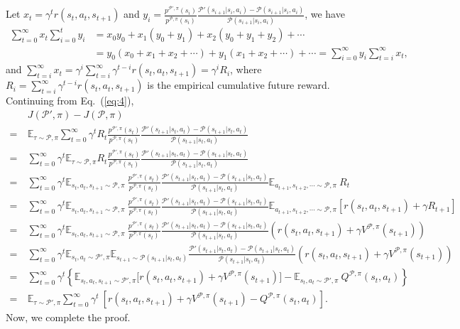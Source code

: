 \documentclass[letterpaper]{article} %
\def\E{{\mathbb{E}}}
\def\P{{\mathcal{P}}}
\begin{document}
Let $x_t=\gamma^t r(s_t,a_t,s_{t+1})$ and $y_i=\frac{p^{\P',\pi}(s_i)}{p^{\P,\pi}(s_i)}
\frac{\P'(s_{i+1}|s_i,a_i)-\P(s_{i+1}|s_i,a_i)}{\P(s_{i+1}|s_i,a_i)}$, we have
{\small
\begin{align*}
\sum_{t=0}^{\infty}x_t\sum_{i=0}^t y_i
&=x_0y_0+x_1(y_0+y_1)+x_2(y_0+y_1+y_2)+\cdots
\\
&=y_0(x_0+x_1+x_2+\cdots)+y_1(x_1+x_2+\cdots)+\cdots
=\sum_{i=0}^{\infty}y_i\sum_{t=i}^{\infty}x_t,
\end{align*}
}\noindent
and $\sum_{t=i}^\infty x_t=\gamma^{i}\sum_{t=i}^\infty\gamma^{t-i} r(s_t,a_t,s_{t+1})=\gamma^i R_i$, where $R_i=\sum_{t=i}^\infty\gamma^{t-i} r(s_t,a_t,s_{t+1})$ is the empirical cumulative future reward. Continuing from Eq.~(\ref{eq:4}),
{\small
\begin{align}
&J(\P',\pi)-J(\P,\pi)
\nonumber
\\
=\ &
\E_{\tau\sim\P,\pi}\sum_{t=0}^{\infty}\gamma^t R_t
\frac{p^{\P',\pi}(s_t)}{p^{\P,\pi}(s_t)}
\frac{\P'(s_{t+1}|s_t,a_t)-\P(s_{t+1}|s_t,a_t)}{\P(s_{t+1}|s_t,a_t)}
\nonumber
\\
=\ &
\sum_{t=0}^{\infty}\gamma^t
\E_{\tau\sim\P,\pi}
R_t\frac{p^{\P',\pi}(s_t)}{p^{\P,\pi}(s_t)}
\frac{\P'(s_{t+1}|s_t,a_t)-\P(s_{t+1}|s_t,a_t)}{\P(s_{t+1}|s_t,a_t)}
\nonumber
\\
=\ &\sum_{t=0}^{\infty}\gamma^t
\E_{s_t,a_t,s_{t+1}\sim\P,\pi}\ 
\frac{p^{\P',\pi}(s_t)}{p^{\P,\pi}(s_t)}
\frac{\P'(s_{t+1}|s_t,a_t)-\P(s_{t+1}|s_t,a_t)}{\P(s_{t+1}|s_t,a_t)}
\E_{a_{t+1},s_{t+2},\cdots\sim\P,\pi}\ R_t
\nonumber
\\
=\ &\sum_{t=0}^{\infty}\gamma^t
\E_{s_t,a_t,s_{t+1}\sim\P,\pi}\ 
\frac{p^{\P',\pi}(s_t)}{p^{\P,\pi}(s_t)}
\frac{\P'(s_{t+1}|s_t,a_t)-\P(s_{t+1}|s_t,a_t)}{\P(s_{t+1}|s_t,a_t)}
\E_{a_{t+1},s_{t+2},\cdots\sim\P,\pi}
\left[
r(s_t,a_t,s_{t+1})+\gamma R_{t+1}
\right]
\nonumber
\\
=\ &\sum_{t=0}^{\infty}\gamma^t
\E_{s_t,a_t,s_{t+1}\sim\P,\pi}\ 
\frac{p^{\P',\pi}(s_t)}{p^{\P,\pi}(s_t)}
\frac{\P'(s_{t+1}|s_t,a_t)-\P(s_{t+1}|s_t,a_t)}{\P(s_{t+1}|s_t,a_t)}
\left(
r(s_t,a_t,s_{t+1})+\gamma V^{\P,\pi}(s_{t+1})
\right)
\nonumber
\\
=\ &\sum_{t=0}^{\infty}\gamma^t
\E_{s_t,a_t\sim\P',\pi}\E_{s_{t+1}\sim\P(s_{t+1}|s_t,a_t)}
\frac{\P'(s_{t+1}|s_t,a_t)-\P(s_{t+1}|s_t,a_t)}{\P(s_{t+1}|s_t,a_t)}
\left(
r(s_t,a_t,s_{t+1})+\gamma V^{\P,\pi}(s_{t+1})
\right)
\nonumber
\\
=\ &\sum_{t=0}^{\infty}\gamma^t\left\{
\E_{s_t,a_t,s_{t+1}\sim\P',\pi}
\big[
r(s_t,a_t,s_{t+1})+\gamma V^{\P,\pi}(s_{t+1})
\big]
-\E_{s_t,a_t\sim\P',\pi}\ Q^{\P,\pi}(s_t,a_t)
\right\}
\nonumber
\\
=\ &\E_{\tau\sim\P',\pi}\sum_{t=0}^{\infty}\gamma^t\ 
\left[
r(s_t,a_t,s_{t+1})+\gamma V^{\P,\pi}(s_{t+1})-Q^{\P,\pi}(s_t,a_t)
\right].
\label{eq:diff}
\end{align}
}\noindent
Now, we complete the proof.
\end{document}
